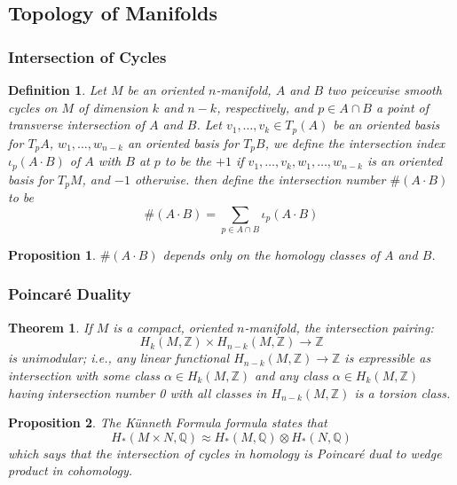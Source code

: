\documentclass{article}
\newtheorem{thm}{Theorem}
\newtheorem{defn}{Definition}
\newtheorem{prop}{Proposition}
\begin{document}
\subsection{Topology of Manifolds}

\subsubsection{Intersection of Cycles}

\begin{defn}
	Let $M$ be an oriented $n$-manifold, $A$ and $B$ two peicewise smooth cycles on $M$ of dimension $k$ and $n-k$, respectively, and $p \in A \cap B$ a point of transverse intersection of $A$ and $B$. Let $v_1, \ldots, v_k \in T_p (A)$ be an oriented basis for $T_p A$, $w_1, \ldots, w_{n-k}$ an oriented basis for $T_pB$, we define the \textit{intersection index} $\iota_p(A \cdot B)$ of $A$ with $B$ at $p$ to be the $+1$ if $ v_1, \ldots, v_k, w_1, \ldots, w_{n-k}$ is an oriented basis for $T_pM$, and $-1$ otherwise. then define the intersection number $ \#(A \cdot B)$ to be 
\[
	\# \left( A \cdot B \right) = \sum_{p \in A \cap B} \iota_p (A \cdot B)
\]

\end{defn}

\begin{prop}
	$\#(A \cdot B)$ depends only on the homology classes of $A$ and $B$.
\end{prop}

\subsubsection{Poincar\'e Duality}

\begin{thm}
	If $M$ is a compact, oriented $n$-manifold, the intersection pairing:
	\[
		H_k \left( M, \mathbb{Z} \right) \times H_{n-k} \left( M, \mathbb{Z} \right) \to \mathbb{Z}
	\]
	is unimodular; i.e., any linear functional $H_{n-k} \left( M, \mathbb{Z} \right) \to \mathbb{Z}$ is expressible as intersection with some class $\alpha \in H_k \left( M, \mathbb{Z} \right) $ and any class $ \alpha \in H_k \left( M, \mathbb{Z} \right) $ having intersection number 0 with all classes in $H_{n-k} \left( M, \mathbb{Z} \right) $ is a torsion class.
\end{thm}

\begin{prop}
	The K\"unneth Formula formula states that
	\[
		H_* \left( M \times N , \mathbb{Q}\right) \approx H_* \left( M, \mathbb{Q} \right) \otimes H_* \left( N, \mathbb{Q} \right)
	\]
	which says that \textit{the intersection of cycles in homology is Poincar\'e dual to wedge product in cohomology.}
\end{prop}
\end{document}
